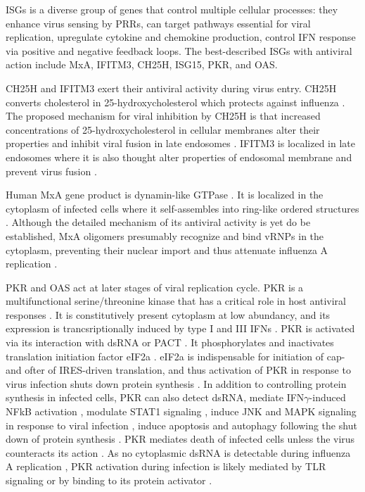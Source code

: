 		\gls{ISG}s is a diverse group of genes that control multiple cellular processes: they enhance virus sensing by \gls{PRR}s, can target pathways essential for viral replication, upregulate cytokine and chemokine production, control \gls{IFN} response via positive and negative feedback loops. The best-described \gls{ISG}s with antiviral action include \gls{MxA}, \gls{IFITM3}, \gls{CH25H}, \gls{ISG15}, \gls{PKR}, and \gls{OAS}. 
		
		\gls{CH25H} and \gls{IFITM3} exert their antiviral activity during virus entry. \gls{CH25H} converts cholesterol in 25-hydroxycholesterol which   protects against influenza \parencite{Blanc2013}. The proposed mechanism for viral inhibition by \gls{CH25H} is that increased concentrations of 25-hydroxycholesterol in cellular membranes alter their properties and inhibit viral fusion in late endosomes \parencite{Liu2013}. \gls{IFITM3} is localized in late endosomes where it is also thought alter properties of endosomal membrane and prevent virus fusion \parencite{Li2013, Desai2014}. 
				
		Human \gls{MxA} gene product is dynamin-like \gls{GTPase} \parencite{Nakayama1992}. It is localized in the cytoplasm of infected cells where it self-assembles into ring-like ordered structures \parencite{Gao2010}. Although the detailed mechanism of its antiviral activity is yet do be established, \gls{MxA} oligomers presumably recognize and bind \gls{vRNP}s in the cytoplasm, preventing their nuclear import and thus attenuate influenza A replication \parencite{Haller2010}.
		
		\gls{PKR} and \gls{OAS} act at later stages of viral replication cycle. \gls{PKR} is a multifunctional serine/threonine kinase that has a critical role in host antiviral responses \parencite{Garcia2006a}. It is constitutively present cytoplasm at low abundancy, and its expression is trancsriptionally induced by type I and III \gls{IFN}s \parencite{Meurs1990}. \gls{PKR} is activated via its interaction with dsRNA or \gls{PACT} \parencite{Li2006a}. It phosphorylates and inactivates translation initiation factor \gls{eIF2a} \parencite{Levin1978}. \gls{eIF2a} is indispensable for initiation of cap- and ofter of \gls{IRES}-driven translation, and thus activation of \gls{PKR} in response to virus infection shuts down protein synthesis \parencite{Kimball1999}. In addition to controlling protein synthesis in infected cells, \gls{PKR} can also detect dsRNA, mediate \gls{IFN}$\gamma$-induced \gls{NFkB} activation \parencite{Deb2001}, modulate \gls{STAT}1 signaling \parencite{Wong1997}, induce \gls{JNK} and \gls{MAPK} signaling in response to viral infection \parencite{Chu1999}, induce apoptosis and autophagy following the shut down of protein synthesis \parencite{Gil2000, Talloczy2002}. \gls{PKR} mediates death of infected cells unless the virus counteracts its action \parencite{Takizawa1996, Hatada1999}. As no cytoplasmic dsRNA is  detectable during influenza A replication \parencite{Wisskirchen2011}, \gls{PKR} activation during infection is likely mediated by \gls{TLR} signaling \parencite{Jiang2003} or by binding to its protein activator \parencite{Garcia2006a}.
		
